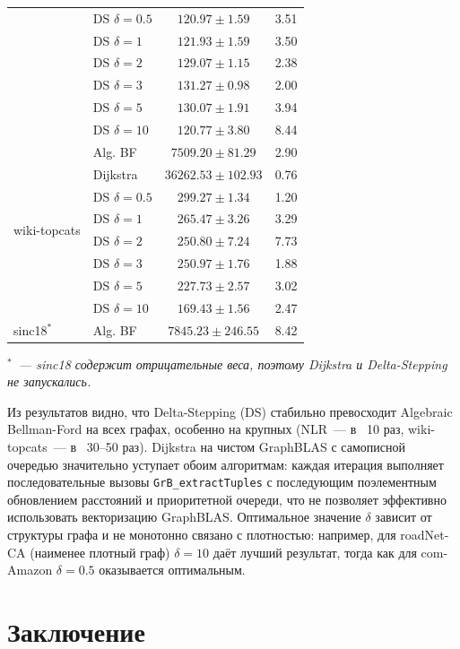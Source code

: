 \documentclass[a4paper]{article}
\begin{document}
\begin{table}[h!]
\begin{minipage}{0.48\textwidth}
\begin{tabular}{llcc}
    & DS $\delta=0.5$ & $120.97 \pm 1.59$ & 3.51 \\
    & DS $\delta=1$ & $121.93 \pm 1.59$ & 3.50 \\
    & DS $\delta=2$ & $129.07 \pm 1.15$ & 2.38 \\
    & DS $\delta=3$ & $131.27 \pm 0.98$ & 2.00 \\
    & DS $\delta=5$ & $130.07 \pm 1.91$ & 3.94 \\
    & DS $\delta=10$ & $120.77 \pm 3.80$ & 8.44 \\
\midrule
\multirow{8}{*}{wiki-topcats}
    & Alg. BF & $7509.20 \pm 81.29$ & 2.90 \\
    & Dijkstra & $36262.53 \pm 102.93$ & 0.76 \\
    & DS $\delta=0.5$ & $299.27 \pm 1.34$ & 1.20 \\
    & DS $\delta=1$ & $265.47 \pm 3.26$ & 3.29 \\
    & DS $\delta=2$ & $250.80 \pm 7.24$ & 7.73 \\
    & DS $\delta=3$ & $250.97 \pm 1.76$ & 1.88 \\
    & DS $\delta=5$ & $227.73 \pm 2.57$ & 3.02 \\
    & DS $\delta=10$ & $169.43 \pm 1.56$ & 2.47 \\
\midrule
\multirow{1}{*}{sinc18$^*$}
    & Alg. BF & $7845.23 \pm 246.55$ & 8.42 \\
\bottomrule
\end{tabular}
\smallskip

\noindent\emph{$^*$~--- sinc18 содержит отрицательные веса, поэтому Dijkstra и Delta-Stepping не запускались.}
\end{minipage}
\end{table}

Из результатов видно, что Delta-Stepping (DS) стабильно превосходит Algebraic Bellman-Ford
на всех графах, особенно на крупных (NLR~--- в ~10 раз, wiki-topcats~--- в ~30--50 раз).
Dijkstra на чистом GraphBLAS с самописной очередью значительно уступает обоим
алгоритмам: каждая итерация выполняет последовательные вызовы
\texttt{GrB\_extractTuples} с последующим поэлементным обновлением расстояний
и приоритетной очереди, что не позволяет эффективно использовать векторизацию
GraphBLAS.
Оптимальное значение $\delta$ зависит от
структуры графа и не монотонно связано с плотностью: например, для roadNet-CA
(наименее плотный граф) $\delta = 10$ даёт лучший результат, тогда как для
com-Amazon $\delta = 0.5$ оказывается оптимальным.

\section{Заключение}
\end{document}
